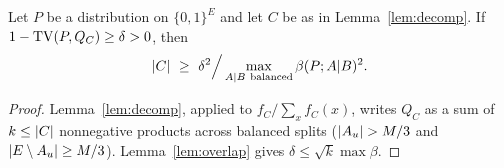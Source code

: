 \begin{corollary}\label{cor:reduction}
Let $P$ be a distribution on $\{0,1\}^E$ and let $C$ be as in Lemma~\ref{lem:decomp}. If $1-\mathrm{TV}(P,Q_C)\ge\delta>0$, then
\[
  \abs C\ \ge\ \delta^2\Big/\max_{A|B\ \mathrm{balanced}}\beta(P;A|B)^2 .
\]
\end{corollary}

\begin{proof}
Lemma~\ref{lem:decomp}, applied to $f_C/\sum_xf_C(x)$, writes $Q_C$ as a sum of $k\le\lvert C\rvert$ nonnegative products across balanced splits ($\lvert A_u\rvert>M/3$ and $\lvert E\setminus A_u\rvert\ge M/3$). Lemma~\ref{lem:overlap} gives $\delta\le\sqrt k\max\beta$.
\end{proof}
